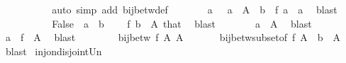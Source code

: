 \begin{isabellebody}
\ \ \ \ \ \ \isamarkupfalse%
\ {\isacharasterisk}{\kern0pt}\ \isamarkupfalse%
\ {\isacharparenleft}{\kern0pt}auto\ simp\ add{\isacharcolon}{\kern0pt}\ bij{\isacharunderscore}{\kern0pt}betw{\isacharunderscore}{\kern0pt}def{\isacharparenright}{\kern0pt}\isanewline
\ \ \ \ \isamarkupfalse%
\ \isamarkupfalse%
\ a\ \ {}{\isacharcolon}{\kern0pt}\ {\isachardoublequoteopen}a\ {\isasymin}\ A\ {\isasymunion}\ {\isacharbraceleft}{\kern0pt}b{\isacharbraceright}{\kern0pt}\ {\isasymand}\ f\ a\ {\isacharequal}{\kern0pt}\ a{\isacharprime}{\kern0pt}{\isachardoublequoteclose}\ \isamarkupfalse%
\ blast\isanewline
\ \ \ \ \isamarkupfalse%
\isanewline
\ \ \ \ \isamarkupfalse%
\ False\ \ {\isachardoublequoteopen}a\ {\isacharequal}{\kern0pt}\ b{\isachardoublequoteclose}\ \isamarkupfalse%
\ {}\ {\isacharasterisk}{\kern0pt}{\isacharasterisk}{\kern0pt}\ {\isacartoucheopen}f\ b\ {\isasymnotin}\ A{\isacharprime}{\kern0pt}{\isacartoucheclose}\ that\ \isamarkupfalse%
\ blast\isanewline
\ \ \ \ \isamarkupfalse%
\ \isamarkupfalse%
\ {\isachardoublequoteopen}a\ {\isasymin}\ A{\isachardoublequoteclose}\ \isamarkupfalse%
\ blast\isanewline
\ \ \ \ \isamarkupfalse%
\ {}\ \isamarkupfalse%
\ {\isachardoublequoteopen}a{\isacharprime}{\kern0pt}\ {\isasymin}\ f\ {\isacharbackquote}{\kern0pt}\ A{\isachardoublequoteclose}\ \isamarkupfalse%
\ blast\isanewline
\ \ \isamarkupfalse%
\isanewline
\ \ \isamarkupfalse%
\ \isamarkupfalse%
\ {\isachardoublequoteopen}bij{\isacharunderscore}{\kern0pt}betw\ f\ A\ A{\isacharprime}{\kern0pt}{\isachardoublequoteclose}\isanewline
\ \ \ \ \isamarkupfalse%
\ {\isacharasterisk}{\kern0pt}\ bij{\isacharunderscore}{\kern0pt}betw{\isacharunderscore}{\kern0pt}subset{\isacharbrackleft}{\kern0pt}of\ f\ {\isachardoublequoteopen}A\ {\isasymunion}\ {\isacharbraceleft}{\kern0pt}b{\isacharbraceright}{\kern0pt}{\isachardoublequoteclose}\ {\isacharunderscore}{\kern0pt}\ A{\isacharbrackright}{\kern0pt}\ \isamarkupfalse%
\ blast\isanewline
{}\isamarkupfalse%
%
\endisatagproof
{\isafoldproof}%
%
\isadelimproof
\isanewline
%
\endisadelimproof
\isanewline
{}\isamarkupfalse%
\ inj{\isacharunderscore}{\kern0pt}on{\isacharunderscore}{\kern0pt}disjoint{\isacharunderscore}{\kern0pt}Un{\isacharcolon}{\kern0pt}\isanewline

\end{isabellebody}
